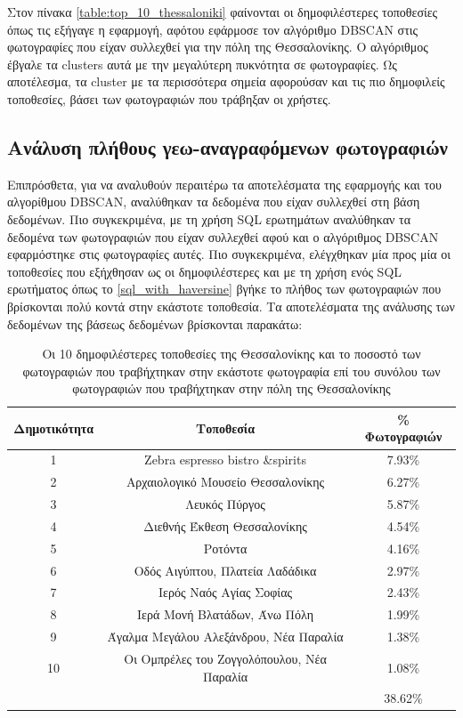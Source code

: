 \documentclass[oneside, 12pt]{book}
\begin{document}
Στον πίνακα \ref{table:top_10_thessaloniki} φαίνονται οι 
δημοφιλέστερες τοποθεσίες όπως τις εξήγαγε η εφαρμογή, αφότου 
εφάρμοσε τον αλγόριθμο DBSCAN στις φωτογραφίες που είχαν συλλεχθεί 
για την πόλη της Θεσσαλονίκης. Ο αλγόριθμος έβγαλε τα clusters αυτά 
με την μεγαλύτερη πυκνότητα σε φωτογραφίες. Ως αποτέλεσμα, τα cluster με τα περισσότερα σημεία αφορούσαν και τις πιο δημοφιλείς τοποθεσίες, βάσει των φωτογραφιών που τράβηξαν οι χρήστες.

\subsection{Ανάλυση πλήθους γεω-αναγραφόμενων φωτογραφιών}
Επιπρόσθετα, για να αναλυθούν περαιτέρω τα αποτελέσματα της εφαρμογής και του αλγορίθμου DBSCAN, αναλύθηκαν τα δεδομένα που είχαν συλλεχθεί στη βάση δεδομένων. Πιο συγκεκριμένα, με τη χρήση SQL ερωτημάτων αναλύθηκαν τα δεδομένα των φωτογραφιών που είχαν συλλεχθεί αφού και ο αλγόριθμος DBSCAN εφαρμόστηκε στις φωτογραφίες αυτές.
Πιο συγκεκριμένα, ελέγχθηκαν μία προς μία οι τοποθεσίες που εξήχθησαν ως οι δημοφιλέστερες και με τη χρήση ενός SQL ερωτήματος όπως το \ref{sql_with_haversine} βγήκε το πλήθος των φωτογραφιών που βρίσκονται πολύ κοντά στην εκάστοτε τοποθεσία.
Τα αποτελέσματα της ανάλυσης των δεδομένων της βάσεως δεδομένων βρίσκονται παρακάτω:
\begin{table}[H]
\centering
    \begin{tabular}{|c|c|c|}
        \hline
        Δημοτικότητα & Τοποθεσία & \% Φωτογραφιών\\
        \hline
        1 & Zebra espresso bistro \&spirits & 7.93\% \\
        2 & Αρχαιολογικό Μουσείο Θεσσαλονίκης & 6.27\% \\
        3 & Λευκός Πύργος & 5.87\% \\
        4 & Διεθνής Έκθεση Θεσσαλονίκης & 4.54\% \\
        5 & Ροτόντα & 4.16\% \\
        6 & Οδός Αιγύπτου, Πλατεία Λαδάδικα & 2.97\% \\
        7 & Ιερός Ναός Αγίας Σοφίας & 2.43\% \\
        8 & Ιερά Μονή Βλατάδων, Άνω Πόλη & 1.99\% \\
        9 & Άγαλμα Μεγάλου Αλεξάνδρου, Νέα Παραλία & 1.38\% \\
        10 & Οι Ομπρέλες του Ζογγολόπουλου, Νέα Παραλία & 1.08\% \\
        \hline
         & & 38.62\%\\
         \hline
    \end{tabular}
    \caption{Οι 10 δημοφιλέστερες τοποθεσίες της Θεσσαλονίκης και το ποσοστό των φωτογραφιών που τραβήχτηκαν στην εκάστοτε φωτογραφία επί του συνόλου των φωτογραφιών που τραβήχτηκαν στην πόλη της Θεσσαλονίκης}
    \label{table:top_10_thessaloniki_place_percentage}
\end{table}
\end{document}
